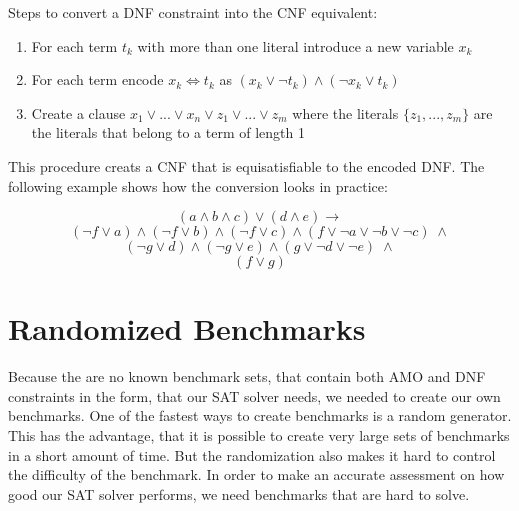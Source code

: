 \begin{leftbar}
Steps to convert a DNF constraint into the CNF equivalent:
\begin{enumerate}
\item For each term $t_k$ with more than one literal introduce a new variable $x_k$
\item For each term encode $x_k \iff t_k$ as $(x_k \vee \neg t_k) \wedge (\neg x_k \vee t_k)$ 
\item Create a clause $x_1 \vee ... \vee x_n \vee z_1 \vee ... \vee z_m$ where the literals $\{z_1,...,z_m\}$ are the literals that belong to a term of length 1
\end{enumerate}
\end{leftbar}

This procedure creats a CNF that is equisatisfiable to the encoded DNF. The following example shows how the conversion looks in practice:

\begin{leftbar}
\begin{displaymath}
(a \wedge b \wedge c) \vee (d \wedge e) \rightarrow
\end{displaymath}
\begin{displaymath}
(\neg f \vee a) \wedge (\neg f \vee b) \wedge (\neg f \vee c) \wedge (f \vee \neg a \vee \neg b \vee \neg c)\; \wedge
\end{displaymath}
\begin{displaymath}
(\neg g \vee d) \wedge (\neg g \vee e) \wedge (g \vee \neg d \vee \neg e) \; \wedge
\end{displaymath}
\begin{displaymath}
(f \vee g)
\end{displaymath}
\end{leftbar}

\section{Randomized Benchmarks}

Because the are no known benchmark sets, that contain both AMO and DNF constraints in the form, that our SAT solver needs, we needed to create our own benchmarks. One of the fastest ways to create benchmarks is a random generator. This has the advantage, that it is possible to create very large sets of benchmarks in a short amount of time. But the randomization also makes it hard to control the difficulty of the benchmark. In order to make an accurate assessment on how good our SAT solver performs, we need benchmarks that are hard to solve.

